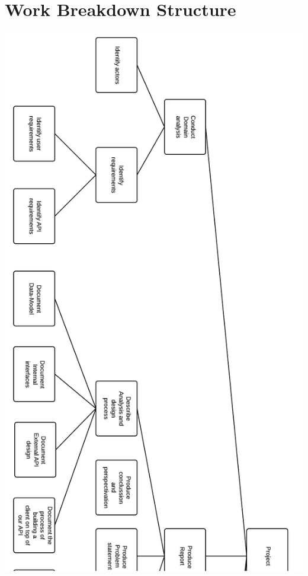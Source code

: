\section{Work Breakdown Structure}
\label{app:workbreak}

\includegraphics[scale=0.45]{./Appendices/workbreakdown-p1.png}

